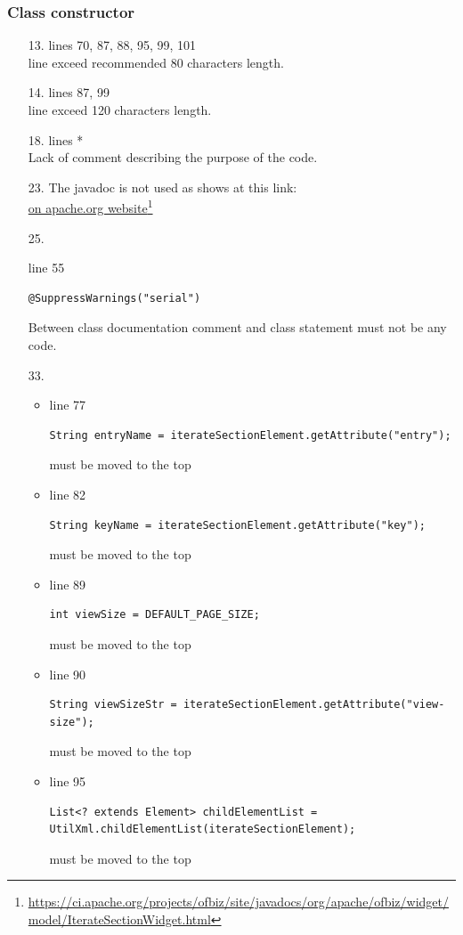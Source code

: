 \documentclass[english]{article}
\newcommand\fnurl[2]{%
	\href{#2}{#1}\footnote{\url{#2}}%
}
\begin{document}
\subsubsection*{Class constructor}	
\begin{itemize}
\item[13.]{lines 70, 87, 88, 95, 99, 101 \\
		line exceed recommended 80 characters length.}

\item[14.]{lines  87, 99\\
		line exceed 120 characters length.}
\item[18.]{lines  *\\
		Lack of comment describing the purpose of the code.}
		
\item[23.]{The javadoc is not used as shows at this link:\\
\fnurl{on apache.org website}{https://ci.apache.org/projects/ofbiz/site/javadocs/org/apache/ofbiz/widget/model/IterateSectionWidget.html}}
	\item[25.]{line 55
		\begin{lstlisting}
@SuppressWarnings("serial")
		\end{lstlisting}
Between class documentation comment and class statement must not be any code.
}

\item[33.]{ 
			\begin{itemize}
				\item{line 77
						\begin{lstlisting}
String entryName = iterateSectionElement.getAttribute("entry");
						\end{lstlisting} must be moved to the top}
				\item{line 82
						\begin{lstlisting}
String keyName = iterateSectionElement.getAttribute("key");
						\end{lstlisting} must be moved to the top}
				\item{line 89
						\begin{lstlisting}
int viewSize = DEFAULT_PAGE_SIZE;
						\end{lstlisting} must be moved to the top}
				\item{line 90
						\begin{lstlisting}
String viewSizeStr = iterateSectionElement.getAttribute("view-size");
						\end{lstlisting} must be moved to the top}
				\item{line 95
						\begin{lstlisting}
List<? extends Element> childElementList = UtilXml.childElementList(iterateSectionElement);
						\end{lstlisting} must be moved to the top}
			\end{itemize}
}
		

\end{itemize}
\end{document}
